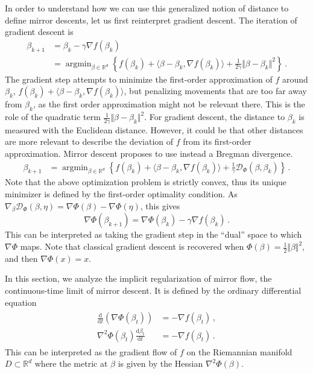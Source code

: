 \documentclass[11pt,reqno]{article}
\DeclareMathOperator*{\argmin}{argmin}
\newcommand{\diff}{\mathrm{d}}
\newcommand{\R}{\mathbb{R}}
\newcommand{\cD}{\mathcal{D}}
\numberwithin{equation}{section}
\theoremstyle{plain}
\theoremstyle{definition}
\theoremstyle{remark}
\begin{document}
In order to understand how we can use this generalized notion of distance to define mirror descents, let us first reinterpret gradient descent. The iteration of gradient descent is 
\begin{align*}
	\beta_{k+1} &= \beta_k - \gamma \nabla f(\beta_k) \\
	&= \argmin_{\beta \in \R^d} \left\{f(\beta_k) + \langle \beta - \beta_k , \nabla f(\beta_k) \rangle + \frac{1}{2\gamma} \Vert\beta - \beta_k \Vert^2 \right\} \, .
\end{align*}
The gradient step attempts to minimize the first-order approximation of $f$ around $\beta_k$, $f(\beta_k) + \langle \beta - \beta_k , \nabla f(\beta_k) \rangle$, but penalizing movements that are too far away from $\beta_k$, as the first order approximation might not be relevant there. This is the role of the quadratic term $\frac{1}{2\gamma} \Vert\beta - \beta_k \Vert^2$. For gradient descent, the distance to $\beta_k$ is measured with the Euclidean distance. However, it could be that other distances are more relevant to describe the deviation of $f$ from its first-order approximation. Mirror descent proposes to use instead a Bregman divergence. 
\begin{align*}
	\beta_{k+1} 
	&= \argmin_{\beta \in \R^d} \left\{f(\beta_k) + \langle \beta - \beta_k , \nabla f(\beta_k) \rangle + \frac{1}{\gamma} \cD_\Phi(\beta, \beta_k) \right\} \, .
\end{align*}
Note that the above optimization problem is strictly convex, thus its unique minimizer is defined by the first-order optimality condition. As $\nabla_\beta \cD_\Phi(\beta, \eta) = \nabla \Phi(\beta) - \nabla \Phi(\eta)$, this gives
\begin{equation*}
	\nabla \Phi(\beta_{k+1}) = \nabla \Phi(\beta_k) - \gamma \nabla f(\beta_k) \, .
\end{equation*}
This can be interpreted as taking the gradient step in the ``dual'' space to which $\nabla \Phi$ maps.
Note that classical gradient descent is recovered when $\Phi(\beta) = \frac{1}{2} \Vert \beta \Vert^2$, and then $\nabla \Phi(x) = x$. 

In this section, we analyze the implicit regularization of mirror flow, the continuous-time limit of mirror descent. It is defined by the ordinary differential equation 
\begin{align}
	\label{eq:mirror-flow}
	\begin{split}
	\frac{\diff}{\diff t} \left(\nabla \Phi(\beta_t)\right) &= - \nabla f(\beta_t) \, , \\
	\nabla^2 \Phi(\beta_t) \frac{\diff \beta_t }{\diff t} &= - \nabla f(\beta_t) \, .
	\end{split}
\end{align}
This can be interpreted as the gradient flow of $f$ on the Riemannian manifold $D \subset \R^d$ where the metric at $\beta$ is given by the Hessian $\nabla^2 \Phi(\beta)$.
\end{document}
